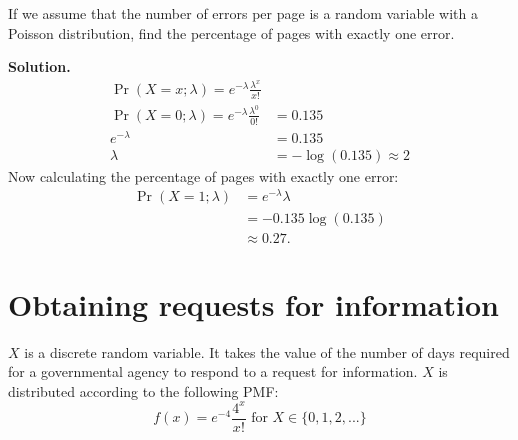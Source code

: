 \documentclass[12pt]{article}
\begin{document}
If we assume that the number of errors per page is a random variable with a Poisson distribution, find the
percentage of pages with exactly one error.

\textbf{Solution.}
\begin{align*}
    \Pr(X=x; \lambda) = e^{-\lambda}\frac{\lambda^x}{x!}
    \\ \Pr(X=0;\lambda) = e^{-\lambda}\frac{\lambda^0}{0!} &= 0.135
    \\  e^{-\lambda} &= 0.135
    \\ \lambda &= -\log(0.135)\approx 2
\end{align*}
Now calculating the percentage of pages with exactly one error:
\begin{align*}
    \Pr(X=1;\lambda) &= e^{-\lambda}\lambda 
    \\ &= -0.135\log(0.135)
    \\ &\approx 0.27.
\end{align*}


\section{Obtaining requests for information}
$X$ is a discrete random variable. It takes the value of the number of days required for a governmental agency to respond to a request for information. $X$ is distributed according to the following PMF:
\[ f(x) = e^{-4} \frac{4^x}{x!} \text{ for } X\in\{0,1,2,...\} \]
\end{document}

